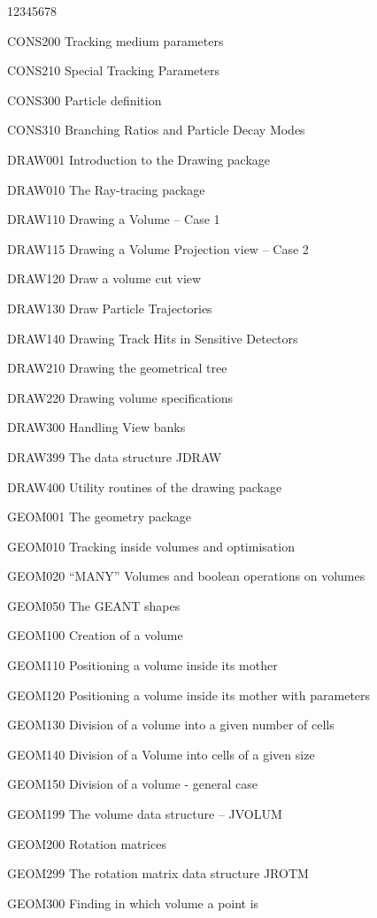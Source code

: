 \begin{DLtt}{12345678}
\item[CONS200] Tracking medium parameters
\item[CONS210] Special Tracking Parameters
\item[CONS300] Particle definition
\item[CONS310] Branching Ratios and Particle Decay Modes
\item[DRAW001] Introduction to the Drawing package
\item[DRAW010] The Ray-tracing package
\item[DRAW110] Drawing a Volume -- Case 1
\item[DRAW115] Drawing a Volume Projection view -- Case 2
\item[DRAW120] Draw a volume cut view
\item[DRAW130] Draw Particle Trajectories
\item[DRAW140] Drawing Track Hits in Sensitive Detectors
\item[DRAW210] Drawing the geometrical tree
\item[DRAW220] Drawing volume specifications
\item[DRAW300] Handling View banks
\item[DRAW399] The data structure JDRAW
\item[DRAW400] Utility routines of the drawing package
\item[GEOM001] The geometry package
\item[GEOM010] Tracking inside volumes and optimisation
\item[GEOM020] ``MANY'' Volumes and boolean operations on volumes
\item[GEOM050] The GEANT shapes
\item[GEOM100] Creation of a volume
\item[GEOM110] Positioning a volume inside its mother
\item[GEOM120] Positioning a volume inside its mother with parameters
\item[GEOM130] Division of a volume into a given number of cells
\item[GEOM140] Division of a Volume into cells of a given size
\item[GEOM150] Division of a volume - general case
\item[GEOM199] The volume data structure -- JVOLUM
\item[GEOM200] Rotation matrices
\item[GEOM299] The rotation matrix data structure JROTM
\item[GEOM300] Finding in which volume a point is

\end{DLtt}
